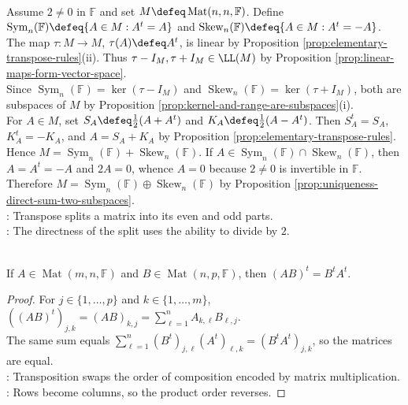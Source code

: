 \begin{example} \label{ex:matrix-space-symmetric-skew-direct-sum} \\
Assume $2\neq0$ in $\mathbb{F}$ and set $M\defeq\operatorname{Mat}(n,n,\mathbb{F})$. Define $\operatorname{Sym}_n(\mathbb{F})\defeq\{A\in M:A^t=A\}$ and $\operatorname{Skew}_n(\mathbb{F})\defeq\{A\in M:A^t=-A\}$.\\
The map $\tau:M\to M$, $\tau(A)\defeq A^t$, is linear by Proposition \ref{prop:elementary-transpose-rules}(ii). Thus $\tau-I_M,\tau+I_M\in\LL(M)$ by Proposition \ref{prop:linear-maps-form-vector-space}.\\
Since $\operatorname{Sym}_n(\mathbb{F})=\ker(\tau-I_M)$ and $\operatorname{Skew}_n(\mathbb{F})=\ker(\tau+I_M)$, both are subspaces of $M$ by Proposition \ref{prop:kernel-and-range-are-subspaces}(i).\\
For $A\in M$, set $S_A\defeq\frac12(A+A^t)$ and $K_A\defeq\frac12(A-A^t)$. Then $S_A^t=S_A$, $K_A^t=-K_A$, and $A=S_A+K_A$ by Proposition \ref{prop:elementary-transpose-rules}.\\
Hence $M=\operatorname{Sym}_n(\mathbb{F})+\operatorname{Skew}_n(\mathbb{F})$. If $A\in\operatorname{Sym}_n(\mathbb{F})\cap\operatorname{Skew}_n(\mathbb{F})$, then $A=A^t=-A$ and $2A=0$, whence $A=0$ because $2\neq0$ is invertible in $\mathbb{F}$. Therefore $M=\operatorname{Sym}_n(\mathbb{F})\oplus\operatorname{Skew}_n(\mathbb{F})$ by Proposition \ref{prop:uniqueness-direct-sum-two-subspaces}.\\
: Transpose splits a matrix into its even and odd parts.\\
: The directness of the split uses the ability to divide by $2$.
\end{example}

\begin{proposition} \label{prop:transpose-reverses-products} \\
If $A\in\operatorname{Mat}(m,n,\mathbb{F})$ and $B\in\operatorname{Mat}(n,p,\mathbb{F})$, then $(AB)^t=B^tA^t$.
\begin{proof}
For $j\in\{1,\ldots,p\}$ and $k\in\{1,\ldots,m\}$, $((AB)^t)_{j,k}=(AB)_{k,j}=\sum\limits_{\ell=1}^{n}A_{k,\ell}B_{\ell,j}$.\\
The same sum equals $\sum\limits_{\ell=1}^{n}(B^t)_{j,\ell}(A^t)_{\ell,k}=(B^tA^t)_{j,k}$, so the matrices are equal.\\
: Transposition swaps the order of composition encoded by matrix multiplication.\\
: Rows become columns, so the product order reverses.
\end{proof}
\end{proposition}

